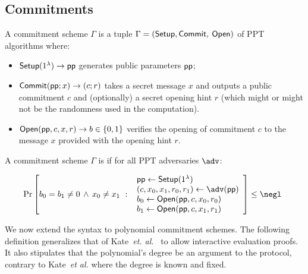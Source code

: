 \subsection{Commitments}
\begin{definition}
A commitment scheme $\Gamma$ is a tuple $\Gamma = (\textsf{{Setup}}, \textsf{{Commit}},$ $\textsf{{Open}})$ of PPT algorithms where:
\begin{itemize}
    \item $\textsf{{Setup}}(1^\lambda) \rightarrow \textsf{pp}$ generates public parameters $\textsf{pp}$;
    \item $\textsf{{Commit}}(\textsf{pp}; x) \rightarrow (c; r)$ takes a secret message $x$ and outputs a public commitment $c$ and (optionally) a secret opening hint $r$ (which might or might not be the randomness used in the computation).
    \item $\textsf{{Open}}(\textsf{pp}, c, x, r) \rightarrow b \in \{0, 1\}$ verifies the opening of commitment $c$ to the message $x$ provided with the opening hint $r$. 
\end{itemize}

A commitment scheme $\Gamma$ is  if for all PPT adversaries $\adv$:
\begin{small}
\[
    \Pr\left[
        b_0 = b_1 \neq 0 \, \wedge \, x_0 \neq x_1 \ : \
        \begin{array}{l}
             \params \gets \pro{Setup}(1^\lambda) \\
             (c, x_0, x_1, r_0, r_1) \gets \adv(\params) \\
             b_0 \gets \pro{Open}(\params, c, x_0, r_0) \\
             b_1 \gets \pro{Open}(\params, c, x_1, r_1) \\
        \end{array}
    \right] \leq \negl \enspace 
\]
\end{small}

\end{definition}

We now extend the syntax to polynomial commitment schemes. The following definition generalizes that of Kate~\emph{et. al.}~\cite{AC:KatZavGol10} to allow interactive evaluation proofs. It also stipulates that the polynomial's degree be an argument to the protocol, contrary to Kate~\emph{et al.} where the degree is known and fixed.

